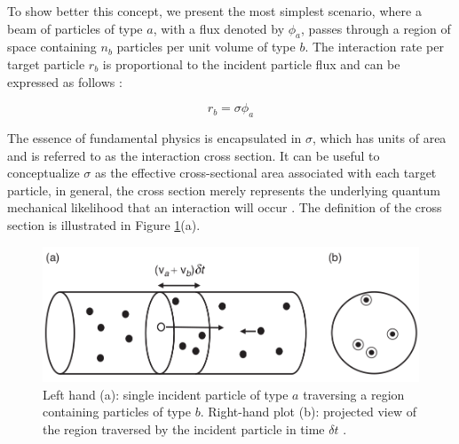 To show better this concept, we present the most simplest scenario, where a beam of particles of type $a$, with a flux denoted by $\phi_{a}$, passes through a region of space containing $n_{b}$ particles per unit volume of type $b$. The interaction rate per target particle $r_{b}$ is proportional to the incident particle flux and can be expressed as follows \cite{thomson_2013}:

\begin{equation*}
  r_{b}=\sigma \phi_{a}
\end{equation*}

The essence of fundamental physics is encapsulated in $\sigma$, which has units of area and is referred to as the interaction cross section. It can be useful to conceptualize $\sigma$ as the effective cross-sectional area associated with each target particle, in general, the cross section merely represents the underlying quantum mechanical likelihood that an interaction will occur \cite{thomson_2013}. The definition of the cross section is illustrated in Figure \ref{cross_section}(a).

\begin{center}
  \begin{figure}[h!]
    \centering
\includegraphics[scale=.35]{Chapter1/cross_section.png} 
 \caption[Cross section illustration]{Left hand (a): single incident particle of type $a$ traversing a region containing particles of type $b$. Right-hand plot (b): projected view of the region traversed by the incident particle in time $\delta t$ \cite{thomson_2013}.}
    \label{cross_section}
  \end{figure}
\end{center}

